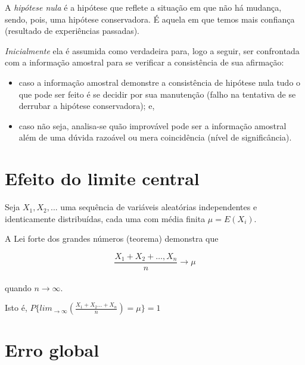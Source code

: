 \documentclass[
]{book}
\providecommand{\tightlist}{%
  \setlength{\itemsep}{0pt}\setlength{\parskip}{0pt}}
\begin{document}
\hfill\break

A \emph{hipótese nula} é a hipótese que reflete a situação em que não há mudança, sendo, pois, uma hipótese conservadora. É aquela em que temos mais confiança (resultado de experiências passadas).

\hfill\break

\emph{Inicialmente} ela é assumida como verdadeira para, logo a seguir, ser confrontada com a informação amostral para se verificar a consistência de sua afirmação:

\hfill\break

\begin{itemize}
\tightlist
\item
  caso a informação amostral demonstre a consistência de hipótese nula tudo o que pode ser feito é se decidir por sua manutenção (falho na tentativa de se derrubar a hipótese conservadora); e,
\item
  caso não seja, analisa-se quão improvável pode ser a informação amostral além de uma dúvida razoável ou mera coincidência (nível de significância).
\end{itemize}

\hfill\break

\hypertarget{efeito-do-limite-central}{%
\section{Efeito do limite central}\label{efeito-do-limite-central}}

Seja \(X_{1}, X_{2}, ...\) uma sequência de variáveis aleatórias independentes e identicamente distribuídas, cada uma com média finita \(\mu=E(X_{i})\).

\hfill\break

A Lei forte dos grandes números (teorema) demonstra que

\hfill\break

\[
\frac{X_{1} + X_{2} + \dots, X_{n}}{n} \to  \mu
\]\\

quando \(n \to \infty\).

\hfill\break

Isto é, \(P\{lim_{\to \infty}(\frac{X_{1} + X_{2} \dots + X_{n}}{n})=\mu\}=1\)

\hfill\break

\hypertarget{erro-global}{%
\section{Erro global}\label{erro-global}}
\end{document}
